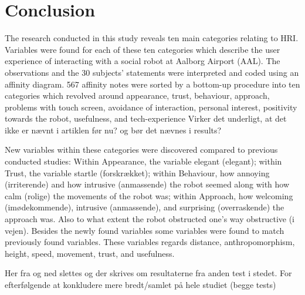 \section{Conclusion}
\label{Conclusion}
%
The research conducted in this study reveals ten main categories relating to HRI. Variables were found for each of these ten categories which describe the user experience of interacting with a social robot at Aalborg Airport (AAL). The observations and the 30 subjects' statements were interpreted and coded using an affinity diagram. 567 affinity notes were sorted by a bottom-up procedure into ten categories which revolved around appearance, trust, behaviour, approach, problems with touch screen, avoidance of interaction, personal interest, positivity towards the robot, usefulness, and tech-experience {\color{red} Virker det underligt, at det ikke er nævnt i artiklen før nu? og bør det nævnes i results?}

New variables within these categories were discovered compared to previous conducted studies: Within Appearance, the variable elegant (elegant); within Trust, the variable startle (forskrækket); within Behaviour, how annoying (irriterende) and how intrusive (anmassende)  the robot seemed along with how calm (rolige) the movements of the robot was; within Approach, how welcoming (imødekommende), intrusive (anmassende), and surprising (overraskende) the approach was. Also to what extent the robot obstructed one's way obstructive (i vejen). Besides the newly found variables some variables were found to match previously found variables. These variables regards distance, anthropomorphism, height, speed, movement, trust, and usefulness.

{\color{red} Her fra og ned slettes og der skrives om resultaterne fra anden test i stedet. For efterfølgende at konkludere mere bredt/samlet på hele studiet (begge tests)}


